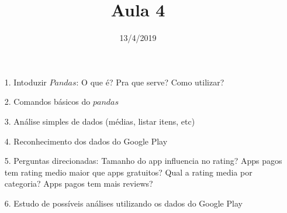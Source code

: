 \documentclass[12pt]{article}
\title{Aula 4}
\date{13/4/2019}
\begin{document}
	\maketitle
	\begin{itemize}
		\item[1.]
			Intoduzir $Pandas$:
			\subitem
				O que é?
			\subitem
				Pra que serve?
			\subitem
				Como utilizar?		 
		\item[2.]
			Comandos básicos do $pandas$
		\item[3.]
			Análise simples de dados (médias, listar itens, etc)
		\item[4.]
			Reconhecimento dos dados do Google Play
		\item[5.]
			Perguntas direcionadas:
			\subitem
				Tamanho do app influencia no rating?
			\subitem	
				Apps pagos tem rating medio maior que apps gratuitos?
			\subitem	
				Qual a rating media por categoria?
			\subitem
				Apps pagos tem mais reviews?	
		\item[6.]
			Estudo de possíveis análises utilizando os dados do
			Google Play
	\end{itemize}
\end{document}
